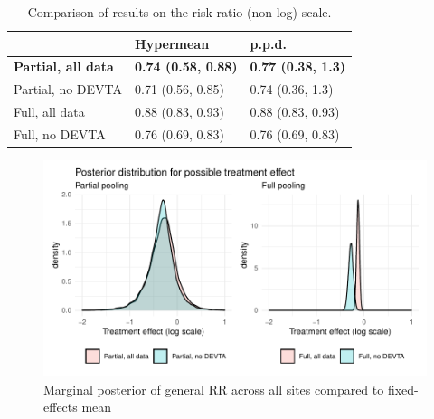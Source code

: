 \documentclass[12pt]{article}
\begin{document}
\begin{table}
\caption{Comparison of results of all four meta-analysis models fitted to our data, on log(RR) scale.}
\label{baggr-models-tab}
\centering
{}
\end{table}

\begin{table}
\caption{Comparison of results on the risk ratio (non-log) scale.}
\label{baggr-tab-exp}
\centering
\begin{tabular}[t]{lll}
\toprule
  & Hypermean & p.p.d.\\
\midrule
\textbf{Partial, all data} & \textbf{0.74 (0.58, 0.88)} & \textbf{0.77 (0.38, 1.3)}\\
Partial, no DEVTA & 0.71 (0.56, 0.85) & 0.74 (0.36, 1.3)\\
Full, all data & 0.88 (0.83, 0.93) & 0.88 (0.83, 0.93)\\
Full, no DEVTA & 0.76 (0.69, 0.83) & 0.76 (0.69, 0.83)\\
\bottomrule
\end{tabular}
\end{table}

\begin{figure}[h!]
\includegraphics{baggr-density.pdf}
\caption{Marginal posterior of general RR across all sites compared to fixed-effects mean}
\label{baggr-density}
\end{figure}
\end{document}
